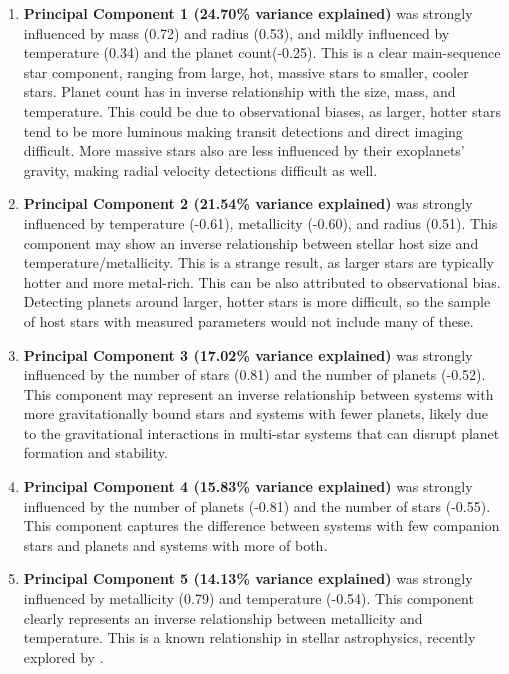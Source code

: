 \documentclass[preprint]{aastex631}
\begin{document}
\begin{enumerate}
  \item \textbf{Principal Component 1 (24.70\% variance explained)} was strongly influenced by mass (0.72) and radius (0.53), and mildly influenced by temperature (0.34) and the planet count(-0.25). This is a clear main-sequence star component, ranging from large, hot, massive stars to smaller, cooler stars. Planet count has in inverse relationship with the size, mass, and temperature. This could be due to observational biases, as larger, hotter stars tend to be more luminous making transit detections and direct imaging difficult. More massive stars also are less influenced by their exoplanets' gravity, making radial velocity detections difficult as well.
  \item \textbf{Principal Component 2 (21.54\% variance explained)} was strongly influenced by temperature (-0.61), metallicity (-0.60), and radius (0.51). This component may show an inverse relationship between stellar host size and temperature/metallicity. This is a strange result, as larger stars are typically hotter and more metal-rich. This can be also attributed to observational bias. Detecting planets around larger, hotter stars is more difficult, so the sample of host stars with measured parameters would not include many of these.
  \item \textbf{Principal Component 3 (17.02\% variance explained)} was strongly influenced by the number of stars (0.81) and the number of planets (-0.52). This component may represent an inverse relationship between systems with more gravitationally bound stars and systems with fewer planets, likely due to the gravitational interactions in multi-star systems that can disrupt planet formation and stability.
  \item \textbf{Principal Component 4 (15.83\% variance explained)} was strongly influenced by the number of planets (-0.81) and the number of stars (-0.55). This component captures the difference between systems with few companion stars and planets and systems with more of both.
  \item \textbf{Principal Component 5 (14.13\% variance explained)} was strongly influenced by metallicity (0.79) and temperature (-0.54). This component clearly represents an inverse relationship between metallicity and temperature. This is a known relationship in stellar astrophysics, recently explored by \citet{martinez-hernandezDESIREDTemperaturemetallicityRelations2026}.
\end{enumerate}
\end{document}
